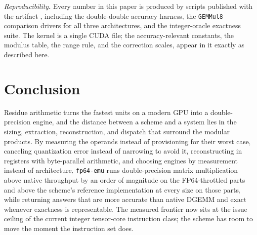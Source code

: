 \documentclass[11pt]{amsart}
\theoremstyle{plain}
\theoremstyle{definition}
\newcommand{\code}[1]{\texttt{#1}}
\newcommand{\fpemu}{\code{fp64-emu}}
\newcommand{\gemmul}{\code{GEMMul8}}
\begin{document}
\emph{Reproducibility.} Every number in this paper is produced by scripts
published with the artifact \cite{fpemurepo}, including the double-double
accuracy harness, the \gemmul{} comparison drivers for all three
architectures, and the integer-oracle exactness suite. The kernel is a
single CUDA file; the accuracy-relevant constants, the modulus table, the
range rule, and the correction scales, appear in it exactly as described
here.

\section{Conclusion}

Residue arithmetic turns the fastest units on a modern GPU into a
double-precision engine, and the distance between a scheme and a system
lies in the sizing, extraction, reconstruction, and dispatch that surround
the modular products. By measuring the operands instead of provisioning
for their worst case, canceling quantization error instead of narrowing to
avoid it, reconstructing in registers with byte-parallel arithmetic, and
choosing engines by measurement instead of architecture, \fpemu{} runs
double-precision matrix multiplication above native throughput by an
order of magnitude on the FP64-throttled parts and above the scheme's
reference implementation at every size on those parts, while returning
answers that are more accurate than native DGEMM and exact whenever
exactness is representable.
The measured frontier now sits at the issue ceiling of the current integer
tensor-core instruction class; the scheme has room to move the moment the
instruction set does.
\end{document}
